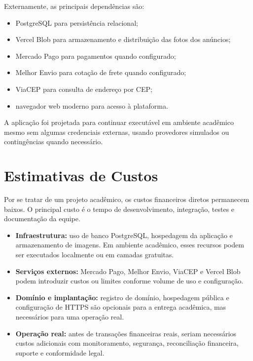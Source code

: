 ﻿\documentclass[12pt,a4paper]{article}
\begin{document}
Externamente, as principais dependências são:

\begin{itemize}
    \item PostgreSQL para persistência relacional;
    \item Vercel Blob para armazenamento e distribuição das fotos dos anúncios;
    \item Mercado Pago para pagamentos quando configurado;
    \item Melhor Envio para cotação de frete quando configurado;
    \item ViaCEP para consulta de endereço por CEP;
    \item navegador web moderno para acesso à plataforma.
\end{itemize}

A aplicação foi projetada para continuar executável em ambiente acadêmico mesmo sem algumas credenciais externas, usando provedores simulados ou contingências quando necessário.

\section{Estimativas de Custos}
Por se tratar de um projeto acadêmico, os custos financeiros diretos permanecem baixos. O principal custo é o tempo de desenvolvimento, integração, testes e documentação da equipe.

\begin{itemize}
    \item \textbf{Infraestrutura:} uso de banco PostgreSQL, hospedagem da aplicação e armazenamento de imagens. Em ambiente acadêmico, esses recursos podem ser executados localmente ou em camadas gratuitas.

    \item \textbf{Serviços externos:} Mercado Pago, Melhor Envio, ViaCEP e Vercel Blob podem introduzir custos ou limites conforme volume de uso e configuração.

    \item \textbf{Domínio e implantação:} registro de domínio, hospedagem pública e configuração de HTTPS são opcionais para a entrega acadêmica, mas necessários para uma operação real.

    \item \textbf{Operação real:} antes de transações financeiras reais, seriam necessários custos adicionais com monitoramento, segurança, reconciliação financeira, suporte e conformidade legal.
\end{itemize}
\end{document}
